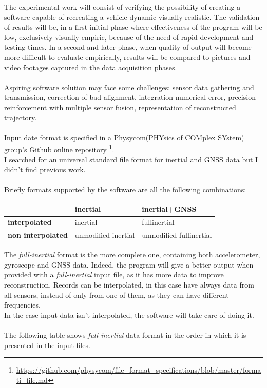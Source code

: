 \justify
The experimental work will consist of verifying the possibility of creating a software capable of recreating a vehicle dynamic visually realistic.
The validation of results will be, in a first initial phase where effectiveness of the program will be low, exclusively visually empiric, because of the need of rapid development and testing times. In a second and later phase, when quality of output will become more difficult to evaluate empirically, results will be compared to pictures and video footages captured in the data acquisition phases. \\
\\
Aspiring software solution may face some challenges: sensor data gathering and transmission, correction of bad alignment, integration numerical error, precision reinforcement with multiple sensor fusion, representation of reconstructed trajectory. \\
\\
Input date format is specified in a Physycom(PHYsics of COMplex SYstem) group's Github online repository \footnote{\url{https://github.com/physycom/file_format_specifications/blob/master/formati_file.md}}. \\
I searched for an universal standard file format for inertial and GNSS data but I didn't find previous work. \\
\\	
Briefly formats supported by the software are all the following combinations:

\begin{center}
\begin{table}[H]
\begin{tabular}{l|l|l|}
\cline{2-3}
 & \textbf{inertial} & \textbf{inertial+GNSS} \\ \hline
\multicolumn{1}{|l|}{\textbf{interpolated}} & inertial & fullinertial \\ \hline
\multicolumn{1}{|l|}{\textbf{non interpolated}} & unmodified-inertial & unmodified-fullinertial \\ \hline
\end{tabular}
\end{table}

\end{center}

\justify
The \textit{full-inertial} format is the more complete one, containing both accelerometer, gyroscope and GNSS data. Indeed, the program will give a better output when provided with a \textit{full-inertial} input file, as it has more data to improve reconstruction. 
Records can be interpolated, in this case have always data from all sensors, instead of only from one of them, as they can have different frequencies. \\
In the case input data isn't interpolated, the software will take care of doing it. \\
\\
The following table shows \textit{full-inertial} data format in the order in which it is presented in the input files.

